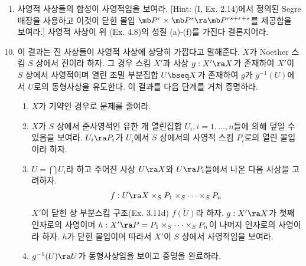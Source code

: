 \begin{enumerate}[label=\tb{4.\arabic*.},itemindent=0mm,itemsep=2mm]
	\begin{enumerate}[label=(\roman*)]
	\item 닫힌 몰입이 $\ms P$를 가진다.
	\item $\ms P$를 가지는 두 사상의 합성이 $\ms P$를 가진다.
	\item $\ms P$가 기반 확대 하에서 안정하다.
	\end{enumerate}
	그 경우 다음이 성립함을 보여라:
	\begin{enumerate}[label=(\alph*)]
	\item $\ms P$를 가지는 사상의 곱은 $\ms P$를 가진다.
	\item 만약 $f:X\ra Y,g:Y\ra Z$가 사상이며 $g\circ f$가 $\ms P$를 가지고 $g$가 분리이면 $f$가 $\ms P$를 가진다.
	\item 만약 $f:X\ra Y$가 $\ms P$를 가지면 $f_{\mrm{red}}:X_{\mrm{red}}\ra Y_{\mrm{red}}$가 $\ms P$를 가진다.
	\end{enumerate}
	[Hint: (b)를 보이기 위하여 그래프 사상 $\Ga_f:X\ra X\times_ZY$를 고려하고
	이것이 대각 사상 $\De:Y\ra Y\times_ZY$로부터 기반 확대에 의해 얻어졌음을 기억해 두라.]
	\item 사영적 사상들의 합성이 사영적임을 보여라.
	[Hint: (I, Ex. 2.14)에서 정의된 Segre 매장을 사용하고 이것이 닫힌 몰입 $\mb P^r\times\mb P^s\ra\mb P^{rs+r+s}$를 제공함을 보여라.]
	사영적 사상이 위 (Ex. 4.8)의 성질 (a)-(f)를 가진다 결론지어라.\\[-2mm]
	\end{enumerate}
	\begin{enumerate}[label=\tb{*4.\arabic*.},itemindent=0mm,itemsep=2mm]
	\setcounter{enumi}{9}
	\item {} 이 결과는 진 사상들이 사영적 사상에 상당히 가깝다고 말해준다.
	$X$가 Noether 스킴 $S$ 상에서 진이라 하자. 그 경우 스킴 $X'$과 사상 $g:X'\ra X$가 존재하여 $X'$이 $S$ 상에서 사영적이며
	열린 조밀 부분집합 $U\bseq X$가 존재하여 $g$가 $g^{-1}(U)$에서 $U$로의 동형사상을 유도한다.
	이 결과를 다음 단계를 거쳐 증명하라.
	\begin{enumerate}[label=(\alph*)]
	\item $X$가 기약인 경우로 문제를 줄여라.
	\item $X$가 $S$ 상에서 준사영적인 유한 개 열린집합 $U_i,i=1,\ldots,n$들에 의해 덮일 수 있음을 보여라.
	$U_i\ra P_i$가 $U_i$에서 $S$ 상에서의 사영적 스킴 $P_i$로의 열린 몰입이라 하자.
	\item $U=\bigcap U_i$라 하고 주어진 사상 $U\ra X$와 $U\ra P_i$들에서 나온 다음 사상을 고려하자.
	$$f:U\ra X\times_SP_1\times_S\cdots\times_SP_n$$
	$X'$이 닫힌 상 부분스킴 구조(Ex. 3.11d) $\overline{f(U)}$라 하자. $g:X'\ra X$가 첫째 인자로의 사영이며
	$h:X'\ra P=P_1\times_S\cdots\times_SP_n$이 나머지 인자로의 사영이라 하자.
	$h$가 닫힌 몰입이며 따라서 $X'$이 $S$ 상에서 사영적임을 보여라.
	\item $g^{-1}(U)\ra U$가 동형사상임을 보이고 증명을 완료하라.\\[-2mm]
	\end{enumerate}
	\end{enumerate}
